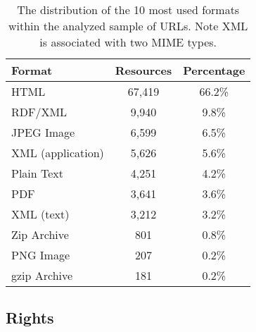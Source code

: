 \documentclass[11pt]{article}
\begin{document}
\begin{table}
    \begin{center}
	\begin{tabular}{l|cc}
            Format   & Resources  & Percentage\\
		
		\hline                                              
                HTML                &	67,419 & 66.2\%\\
                RDF/XML             &	9,940  & 9.8\% \\
                JPEG Image          &   6,599  & 6.5\% \\
                XML (application)   &	5,626  & 5.6\% \\
                Plain Text          & 4,251    & 4.2\% \\
                PDF                 &	3,641  & 3.6\% \\
                XML (text)          & 3,212    & 3.2\% \\
                Zip Archive         &	801    & 0.8\% \\
                PNG Image           & 207      & 0.2\% \\
                gzip Archive        & 181      & 0.2\% \\
	\end{tabular}
    \end{center}
	\caption{\label{tab:formats}The distribution of the 10 most used formats within the
        analyzed sample of URLs. Note XML is associated with two MIME types.}
\end{table}

\subsection{Rights}
\end{document}
